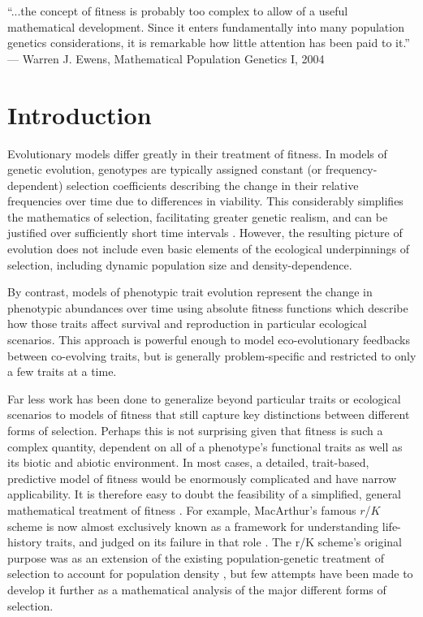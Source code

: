 \documentclass[11pt]{article}
\begin{document}
\newpage{}

``...the concept of fitness is probably too complex to allow of a useful mathematical development. Since it enters fundamentally into many population genetics considerations, it is remarkable how little attention has been paid to it.'' --- Warren J. Ewens, Mathematical Population Genetics I, 2004 

\section*{Introduction}

Evolutionary models differ greatly in their treatment of fitness. In models of genetic evolution, genotypes are typically assigned constant (or frequency-dependent) selection coefficients describing the change in their relative frequencies over time due to differences in viability. This considerably simplifies the mathematics of selection, facilitating greater genetic realism, and can be justified over sufficiently short time intervals \citep[p. 276]{ewens_2012}. However, the resulting picture of evolution does not include even basic elements of the ecological underpinnings of selection, including dynamic population size and density-dependence.

By contrast, models of phenotypic trait evolution represent the change in phenotypic abundances over time using absolute fitness functions which describe how those traits affect survival and reproduction in particular ecological scenarios. This approach is powerful enough to model eco-evolutionary feedbacks between co-evolving traits, but is generally problem-specific and restricted to only a few traits at a time.

Far less work has been done to generalize beyond particular traits or ecological scenarios to models of fitness that still capture key distinctions between different forms of selection. Perhaps this is not surprising given that fitness is such a complex quantity, dependent on all of a phenotype's functional traits \citep{violle_2007} as well as its biotic and abiotic environment. In most cases, a detailed, trait-based, predictive model of fitness would be enormously complicated and have narrow applicability. It is therefore easy to doubt the feasibility of a simplified, general mathematical treatment of fitness \citep[p. 276]{ewens_2012}. For example, MacArthur's famous $r$/$K$ scheme \citep{macarthur_1962,macarthur_1967} is now almost exclusively known as a framework for understanding life-history traits, and judged on its failure in that role \citep{pianka_1970,stearns_1977,boyce_1984,reznick_2002}. The r/K scheme's original purpose was as an extension of the existing population-genetic treatment of selection to account for population density \citep{macarthur_1962}, but few attempts have been made to develop it further as a mathematical analysis of the major different forms of selection. 
\end{document}
